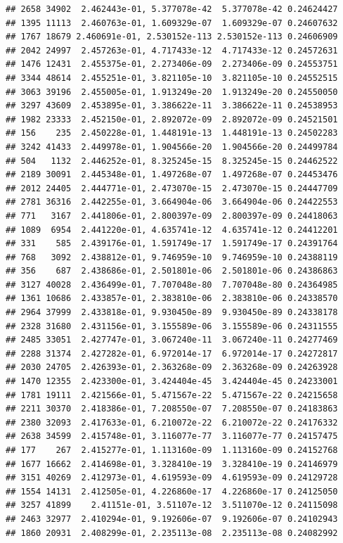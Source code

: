 \documentclass[
]{article}
\begin{document}
\begin{verbatim}
## 2658 34902  2.462443e-01, 5.377078e-42  5.377078e-42 0.24624427
## 1395 11113  2.460763e-01, 1.609329e-07  1.609329e-07 0.24607632
## 1767 18679 2.460691e-01, 2.530152e-113 2.530152e-113 0.24606909
## 2042 24997  2.457263e-01, 4.717433e-12  4.717433e-12 0.24572631
## 1476 12431  2.455375e-01, 2.273406e-09  2.273406e-09 0.24553751
## 3344 48614  2.455251e-01, 3.821105e-10  3.821105e-10 0.24552515
## 3063 39196  2.455005e-01, 1.913249e-20  1.913249e-20 0.24550050
## 3297 43609  2.453895e-01, 3.386622e-11  3.386622e-11 0.24538953
## 1982 23333  2.452150e-01, 2.892072e-09  2.892072e-09 0.24521501
## 156    235  2.450228e-01, 1.448191e-13  1.448191e-13 0.24502283
## 3242 41433  2.449978e-01, 1.904566e-20  1.904566e-20 0.24499784
## 504   1132  2.446252e-01, 8.325245e-15  8.325245e-15 0.24462522
## 2189 30091  2.445348e-01, 1.497268e-07  1.497268e-07 0.24453476
## 2012 24405  2.444771e-01, 2.473070e-15  2.473070e-15 0.24447709
## 2781 36316  2.442255e-01, 3.664904e-06  3.664904e-06 0.24422553
## 771   3167  2.441806e-01, 2.800397e-09  2.800397e-09 0.24418063
## 1089  6954  2.441220e-01, 4.635741e-12  4.635741e-12 0.24412201
## 331    585  2.439176e-01, 1.591749e-17  1.591749e-17 0.24391764
## 768   3092  2.438812e-01, 9.746959e-10  9.746959e-10 0.24388119
## 356    687  2.438686e-01, 2.501801e-06  2.501801e-06 0.24386863
## 3127 40028  2.436499e-01, 7.707048e-80  7.707048e-80 0.24364985
## 1361 10686  2.433857e-01, 2.383810e-06  2.383810e-06 0.24338570
## 2964 37999  2.433818e-01, 9.930450e-89  9.930450e-89 0.24338178
## 2328 31680  2.431156e-01, 3.155589e-06  3.155589e-06 0.24311555
## 2485 33051  2.427747e-01, 3.067240e-11  3.067240e-11 0.24277469
## 2288 31374  2.427282e-01, 6.972014e-17  6.972014e-17 0.24272817
## 2030 24705  2.426393e-01, 2.363268e-09  2.363268e-09 0.24263928
## 1470 12355  2.423300e-01, 3.424404e-45  3.424404e-45 0.24233001
## 1781 19111  2.421566e-01, 5.471567e-22  5.471567e-22 0.24215658
## 2211 30370  2.418386e-01, 7.208550e-07  7.208550e-07 0.24183863
## 2380 32093  2.417633e-01, 6.210072e-22  6.210072e-22 0.24176332
## 2638 34599  2.415748e-01, 3.116077e-77  3.116077e-77 0.24157475
## 177    267  2.415277e-01, 1.113160e-09  1.113160e-09 0.24152768
## 1677 16662  2.414698e-01, 3.328410e-19  3.328410e-19 0.24146979
## 3151 40269  2.412973e-01, 4.619593e-09  4.619593e-09 0.24129728
## 1554 14131  2.412505e-01, 4.226860e-17  4.226860e-17 0.24125050
## 3257 41899    2.41151e-01, 3.51107e-12  3.511070e-12 0.24115098
## 2463 32977  2.410294e-01, 9.192606e-07  9.192606e-07 0.24102943
## 1860 20931  2.408299e-01, 2.235113e-08  2.235113e-08 0.24082992

\end{verbatim}
\end{document}
